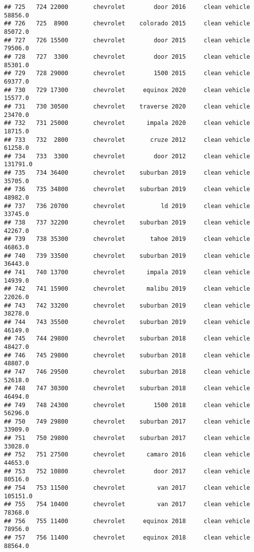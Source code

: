 \documentclass[
]{article}
\begin{document}
\begin{verbatim}
## 725   724 22000       chevrolet        door 2016     clean vehicle   58856.0
## 726   725  8900       chevrolet    colorado 2015     clean vehicle   85072.0
## 727   726 15500       chevrolet        door 2015     clean vehicle   79506.0
## 728   727  3300       chevrolet        door 2015     clean vehicle   85301.0
## 729   728 29000       chevrolet        1500 2015     clean vehicle   69377.0
## 730   729 17300       chevrolet     equinox 2020     clean vehicle   15577.0
## 731   730 30500       chevrolet    traverse 2020     clean vehicle   23470.0
## 732   731 25000       chevrolet      impala 2020     clean vehicle   18715.0
## 733   732  2800       chevrolet       cruze 2012     clean vehicle   61258.0
## 734   733  3300       chevrolet        door 2012     clean vehicle  131791.0
## 735   734 36400       chevrolet    suburban 2019     clean vehicle   35705.0
## 736   735 34800       chevrolet    suburban 2019     clean vehicle   48982.0
## 737   736 20700       chevrolet          ld 2019     clean vehicle   33745.0
## 738   737 32200       chevrolet    suburban 2019     clean vehicle   42267.0
## 739   738 35300       chevrolet       tahoe 2019     clean vehicle   46863.0
## 740   739 33500       chevrolet    suburban 2019     clean vehicle   36443.0
## 741   740 13700       chevrolet      impala 2019     clean vehicle   14939.0
## 742   741 15900       chevrolet      malibu 2019     clean vehicle   22026.0
## 743   742 33200       chevrolet    suburban 2019     clean vehicle   38278.0
## 744   743 35500       chevrolet    suburban 2019     clean vehicle   46149.0
## 745   744 29800       chevrolet    suburban 2018     clean vehicle   48427.0
## 746   745 29800       chevrolet    suburban 2018     clean vehicle   48807.0
## 747   746 29500       chevrolet    suburban 2018     clean vehicle   52618.0
## 748   747 30300       chevrolet    suburban 2018     clean vehicle   46494.0
## 749   748 24300       chevrolet        1500 2018     clean vehicle   56296.0
## 750   749 29800       chevrolet    suburban 2017     clean vehicle   33909.0
## 751   750 29800       chevrolet    suburban 2017     clean vehicle   33028.0
## 752   751 27500       chevrolet      camaro 2016     clean vehicle   44653.0
## 753   752 10800       chevrolet        door 2017     clean vehicle   80516.0
## 754   753 11500       chevrolet         van 2017     clean vehicle  105151.0
## 755   754 10400       chevrolet         van 2017     clean vehicle   78368.0
## 756   755 11400       chevrolet     equinox 2018     clean vehicle   78956.0
## 757   756 11400       chevrolet     equinox 2018     clean vehicle   88564.0

\end{verbatim}
\end{document}
